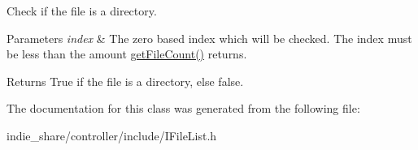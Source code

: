 Check if the file is a directory. 


\begin{DoxyParams}{Parameters}
{\em index} & The zero based index which will be checked. The index must be less than the amount \hyperlink{classirr_1_1io_1_1IFileList_a871861be76e18d58274c4580b1d103b9}{get\+File\+Count()} returns. \\
\hline
\end{DoxyParams}
\begin{DoxyReturn}{Returns}
True if the file is a directory, else false. 
\end{DoxyReturn}


The documentation for this class was generated from the following file\+:\begin{DoxyCompactItemize}
\item 
indie\+\_\+share/controller/include/I\+File\+List.\+h\end{DoxyCompactItemize}
